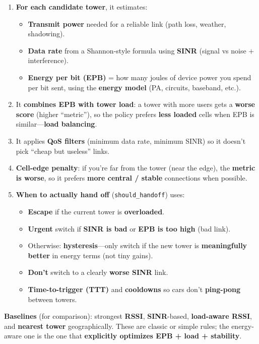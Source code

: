 \documentclass[11pt,a4paper]{article}
\begin{document}
\begin{assistmsg}
\begin{enumerate}[label=\arabic*.]
\item \textbf{For each candidate tower}, it estimates:
  \begin{itemize}
  \item \textbf{Transmit power} needed for a reliable link (path loss, weather, shadowing).
  \item \textbf{Data rate} from a Shannon-style formula using \textbf{SINR} (signal vs noise + interference).
  \item \textbf{Energy per bit (EPB)} = how many joules of device power you spend per bit sent, using the \textbf{energy model} (PA, circuits, baseband, etc.).
  \end{itemize}
\item It \textbf{combines EPB with tower load}: a tower with more users gets a \textbf{worse score} (higher ``metric''), so the policy prefers \textbf{less loaded} cells when EPB is similar---\textbf{load balancing}.
\item It applies \textbf{QoS filters} (minimum data rate, minimum SINR) so it doesn't pick ``cheap but useless'' links.
\item \textbf{Cell-edge penalty}: if you're far from the tower (near the edge), the \textbf{metric is worse}, so it prefers \textbf{more central / stable} connections when possible.
\item \textbf{When to actually hand off} (\texttt{should\_handoff}) uses:
  \begin{itemize}
  \item \textbf{Escape} if the current tower is \textbf{overloaded}.
  \item \textbf{Urgent} switch if \textbf{SINR is bad} or \textbf{EPB is too high} (bad link).
  \item Otherwise: \textbf{hysteresis}---only switch if the new tower is \textbf{meaningfully better} in energy terms (not tiny gains).
  \item \textbf{Don't} switch to a clearly \textbf{worse SINR} link.
  \item \textbf{Time-to-trigger (TTT)} and \textbf{cooldowns} so cars don't \textbf{ping-pong} between towers.
  \end{itemize}
\end{enumerate}

\textbf{Baselines} (for comparison): strongest \textbf{RSSI}, \textbf{SINR}-based, \textbf{load-aware RSSI}, and \textbf{nearest tower} geographically. These are classic or simple rules; the energy-aware one is the one that \textbf{explicitly optimizes EPB + load + stability}.


\end{assistmsg}
\end{document}
